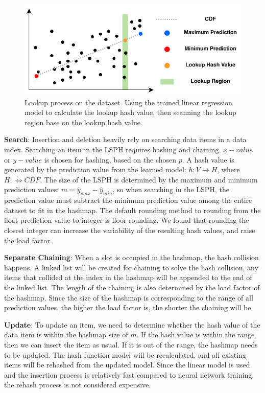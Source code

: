 \begin{figure}[ht]
\centering
\includegraphics{Figures/search.pdf}
\caption{Lookup process on the dataset. Using the trained linear regression model to calculate the lookup hash value, then scanning the lookup region base on the lookup hash value.}
\label{fig:search}
\end{figure}


\textbf{Search}: Insertion and deletion heavily rely on searching data items in a data index. Searching an item in the LSPH requires hashing and chaining. $x-value$ or $y-value$ is chosen for hashing, based on the chosen $p$. A hash value is generated by the prediction value from the learned model: $h : V \rightarrow H$, where $H: \Leftrightarrow CDF$. The size of the LSPH is determined by the maximum and minimum prediction values: $m = \hat{y}_{max} - \hat{y}_{min}$, so when searching in the LSPH, the prediction value must subtract the minimum prediction value among the entire dataset to fit in the hashmap. The default rounding method to rounding from the float prediction value to integer is floor rounding. We found that rounding the closest integer can increase the variability of the resulting hash values, and raise the load factor. 


\textbf{Separate Chaining}: When a slot is occupied in the hashmap, the hash collision happens. A linked list will be created for chaining to solve the hash collision, any items that collided at the index in the hashmap will be appended to the end of the linked list. The length of the chaining is also determined by the load factor of the hashmap. Since the size of the hashmap is corresponding to the range of all prediction values, the higher the load factor is, the shorter the chaining will be. 

\textbf{Update}: To update an item, we need to determine whether the hash value of the data item is within the hashmap size of $m$. If the hash value is within the range, then we can insert the item as usual. If it is out of the range, the hashmap needs to be updated. The hash function model will be recalculated, and all existing items will be rehashed from the updated model. Since the linear model is used and the insertion process is relatively fast compared to neural network training, the rehash process is not considered expensive. 

